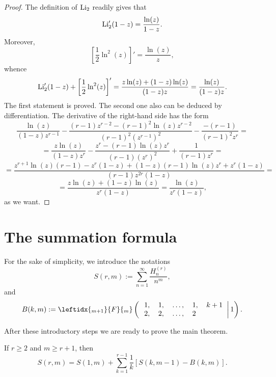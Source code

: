 \documentclass[a4paper,12pt]{amsart}
\begin{document}
\begin{proof}
The definition of ${\mathop{\textup{Li}}\nolimits}_2$ readily gives that
\[{\mathop{\textup{Li}}\nolimits}_2'(1-z)=\frac{\ln(z)}{1-z}.\]
Moreover,
\[\left[\frac{1}{2}\ln^2(z)\right]'=\frac{\ln(z)}{z},\]
whence
\[{\mathop{\textup{Li}}\nolimits}_2'(1-z)+\left[\frac{1}{2}\ln^2(z)\right]'=\frac{z\ln(z)+(1-z)\ln(z)}{(1-z)z}=\frac{\ln(z)}{(1-z)z}.\]
The first statement is proved. The second one also can be deduced by differentiation. The derivative of the right-hand side has the form
\[\frac{\ln(z)}{(1-z)z^{r-1}}-\frac{(r-1)z^{r-2}-(r-1)^2\ln(z)z^{r-2}}{(r-1)^2(z^{r-1})^2}-\frac{-(r-1)}{(r-1)^2z^r}=\]
\[=\frac{z\ln(z)}{(1-z)z^r}-\frac{z^r-(r-1)\ln(z)z^r}{(r-1)(z^r)^2}+\frac{1}{(r-1)z^r}=\]
\[=\frac{z^{r+1}\ln(z)(r-1)-z^r(1-z)+(1-z)(r-1)\ln(z)z^r+z^r(1-z)}{(r-1)z^{2r}(1-z)}=\]
\[=\frac{z\ln(z)+(1-z)\ln(z)}{z^r(1-z)}=\frac{\ln(z)}{z^r(1-z)},\]
as we want.
\end{proof}

\section{The summation formula}

For the sake of simplicity, we introduce the notations
\[S(r,m):=\sum_{n=1}^\infty\frac{H_n^{(r)}}{n^m},\]
and
\[B(k,m):=\leftidx{_{m+1}}{F}{_m}\left(\left.\begin{tabular}{lllll}$1,$&$1,$&$\dots,$&$1,$&$k+1$\\$2,$&$2$,&$\dots,$&$2$\end{tabular}\right|1\right).\]

After these introductory steps we are ready to prove the main theorem.

\begin{Theorem} If $r\ge 2$ and $m\ge r+1$, then
\[S(r,m)=S(1,m)+\sum_{k=1}^{r-1}\frac{1}{k}\left[S(k,m-1)-B(k,m)\right].\]
\end{Theorem}
\end{document}
